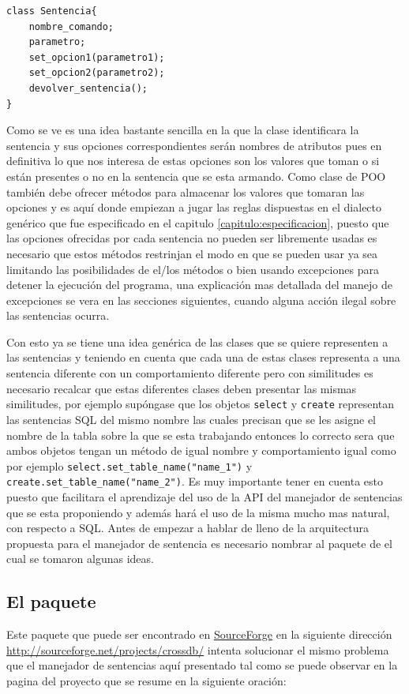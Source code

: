 \begin{lstlisting}[title=Pseudocódigo de la estructura de dato que contiene la sentencia]
class Sentencia{
	nombre_comando;
	parametro;
	set_opcion1(parametro1);
	set_opcion2(parametro2);
	devolver_sentencia();
}
\end{lstlisting}
Como se ve es una idea bastante sencilla en la que la clase identificara la sentencia y sus opciones correspondientes serán nombres de atributos pues en definitiva lo que nos interesa de estas opciones son los valores que toman o si están presentes o no en la sentencia que se esta armando. Como clase de POO también debe ofrecer métodos para almacenar los valores que tomaran las opciones y es aquí donde empiezan a jugar las reglas dispuestas en el dialecto genérico que fue especificado en el capitulo \ref{capitulo:especificacion}, puesto que las opciones ofrecidas por cada sentencia no pueden ser libremente usadas es necesario que estos métodos restrinjan el modo en que se pueden usar ya sea limitando las posibilidades de el/los métodos o bien usando excepciones para detener la ejecución del programa, una explicación mas detallada del manejo de excepciones se vera en las secciones siguientes, cuando alguna acción ilegal sobre las sentencias ocurra.

Con esto ya se tiene una idea genérica de las clases que se quiere representen a las sentencias y teniendo en cuenta que cada una de estas clases representa a una sentencia diferente con un comportamiento diferente pero con similitudes es necesario recalcar que estas diferentes clases deben presentar las mismas similitudes, por ejemplo supóngase que los objetos \verb|select| y \verb|create| representan las sentencias SQL del mismo nombre las cuales precisan que se les asigne el nombre de la tabla sobre la que se esta trabajando entonces lo correcto sera que ambos objetos tengan un método de igual nombre y comportamiento igual como por ejemplo \verb=select.set_table_name("name_1")= y \verb=create.set_table_name("name_2")=. Es muy importante tener en cuenta esto puesto que facilitara el aprendizaje del uso de la API del manejador de sentencias que se esta proponiendo y además hará el uso de la misma mucho mas natural, con respecto a SQL. Antes de empezar a hablar de lleno de la arquitectura propuesta para el manejador de sentencia es necesario nombrar al paquete \cc de el cual se tomaron algunas ideas.

\subsection{El paquete \cc}
Este paquete que puede ser encontrado en \href{http://sourceforge.net}{SourceForge} en la siguiente dirección \url{http://sourceforge.net/projects/crossdb/} intenta solucionar el mismo problema que el manejador de sentencias aquí presentado tal como se puede observar en la pagina del proyecto que se resume en la siguiente oración:

